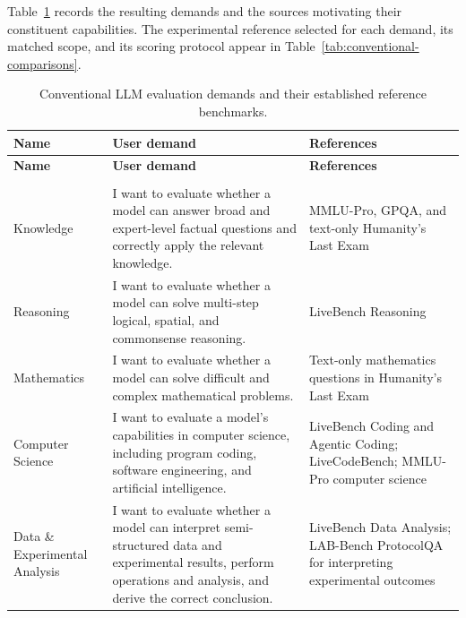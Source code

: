 \documentclass{article} %
\begin{document}
	Table~\ref{tab:conventional-llm-demands} records the resulting demands and
	the sources motivating their constituent capabilities. The experimental
	reference selected for each demand, its matched scope, and its scoring protocol
	appear in Table~\ref{tab:conventional-comparisons}.
	
	\begingroup
	\footnotesize
	\renewcommand{\arraystretch}{1.08}
	\begin{longtable}{@{}>{\raggedright\arraybackslash}p{}>{\raggedright\arraybackslash}p{}>{\raggedright\arraybackslash}p{}@{}}
		\caption{Conventional LLM evaluation demands and their established reference benchmarks.}
		\label{tab:conventional-llm-demands}\\
		\toprule
		\textbf{Name} & \textbf{User demand} & \textbf{References} \\
		\midrule
		\endfirsthead
		\toprule
		\textbf{Name} & \textbf{User demand} & \textbf{References} \\
		\midrule
		\endhead
		\midrule
		\multicolumn{3}{r}{\emph{Continued on next page}}\\
		\endfoot
		\bottomrule
		\endlastfoot
		
		Knowledge
		& I want to evaluate whether a model can answer broad and expert-level factual
		questions and correctly apply the relevant knowledge.
		& MMLU-Pro, GPQA, and text-only Humanity's Last Exam~\citep{wang2024mmlupro,rein2024gpqa,phang2025hle} \\
		
		\midrule
		Reasoning
		& I want to evaluate whether a model can solve multi-step logical, spatial, and commonsense reasoning.
		& LiveBench Reasoning~\citep{white2024livebench} \\
		\midrule
		Mathematics
		& I want to evaluate whether a model can solve difficult and complex mathematical problems.
		& Text-only mathematics questions in Humanity's Last Exam~\citep{phang2025hle} \\
		
		\midrule
		Computer Science
		& I want to evaluate a model's capabilities in computer science, including program coding, software engineering, and artificial intelligence.
		& LiveBench Coding and Agentic Coding; LiveCodeBench; MMLU-Pro computer science~\citep{white2024livebench,livebenchchangelog,jain2024livecodebench,wang2024mmlupro} \\
		
		\midrule
		Data \& Experimental Analysis
		& I want to evaluate whether a model can interpret semi-structured
		data and experimental results, perform operations and analysis, and derive the correct conclusion.
		& LiveBench Data Analysis; LAB-Bench ProtocolQA for interpreting experimental outcomes~\citep{white2024livebench,laurent2024labbench} \\
		

\end{longtable}
\end{document}
